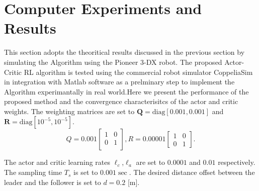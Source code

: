\documentclass[conference]{IEEEtran}
\begin{document}
 \section{Computer Experiments and Results}
 \label{sec:resultsExperiments}
 This section adopts the theoritical results discussed in the previous section by simulating the Algorithm using the Pioneer 3-DX  robot. The proposed Actor-Critic RL algorithm is tested using the commercial robot simulator CoppeliaSim in integration with Matlab software as a prelminary step to implement the Algorithm experimantally in real world.Here we present the performance of the proposed method and the convergence characterisitcs of the actor and critic weights. The weighting matrices are set to $\mathbf{Q} = \mathrm{diag}[0.001,0.001]$ and $\mathbf{R} = \mathrm{diag}[10^{-5}, 10^{-5}].$ %
  \[Q=0.001 
  \begin{bmatrix}
  1       & 0   \\
  0       & 1   \\
  \end{bmatrix},
  R=0.00001
  \begin{bmatrix}
  1       & 0 \\
  0       & 1 
  \end{bmatrix}.\]
  
  
 The actor and critic learning rates $\ell_c$,$\ell_a$ are set to  $0.0001$ and $0.01$ respectively. The sampling time $T_s$ is set to $0.001 \sec.$ The desired distance offset between the leader and the follower is set to $ d = 0.2$ [m].
\end{document}
